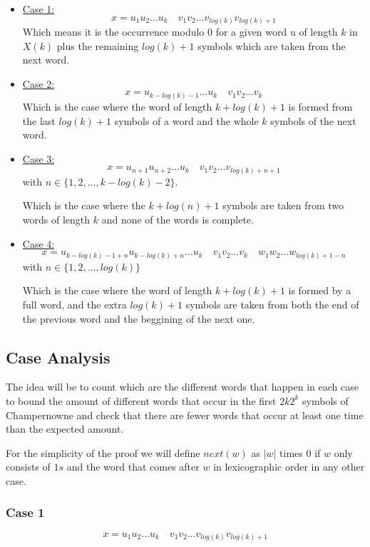 \documentclass[10pt, a4paper]{article}
\theoremstyle{definition}
\begin{document}
\begin{itemize}
  \item \underline{Case 1:} 
  $$x = u_1 u_2 \dots u_k \quad v_1 v_2 \dots v_{log(k)} v_{log(k) + 1}$$
    Which means it is the occurrence modulo 0 for a given word u of length $k$ in $X(k)$ plus the remaining $log(k) + 1$ symbols which are taken from the next word.

  \item \underline{Case 2:} 
  $$ x = u_{k-log(k)-1} \dots u_k \quad v_1 v_2 \dots v_k$$
  Which is the case where the word of length $k + log(k) + 1$ is formed from the last $log(k) + 1$ symbols of a word and the whole $k$ symbols of the next word.

  \item \underline{Case 3:} 
  $$x = u_{n+1} u_{n+2} \dots u_k \quad  v_1 v_2 \dots v_{log(k)+n+1} $$
with $n \in \{1,2,\dots ,k - log(k) - 2\}$.

   Which is the case where the $k + log(n) + 1$ symbols are taken from two words of length $k$ and none of the words is complete.

  
  \item \underline{Case 4:} 
  $$ x = u_{k-log(k)-1+n} u_{k-log(k)+n} \dots u_k \quad v_1 v_2 \dots v_k \quad w_1 w_2 \dots w_{log(k)+1-n}$$
  with $n \in \{1, 2, \dots , log(k)\}$
  
  Which is the case where the word of length $k + log(k) + 1$ is formed by a full word, and the extra $log(k) + 1$ symbols are taken from both the end of the previous word and the beggining of the next one.

\end{itemize}

\subsection{Case Analysis}
The idea will be to count which are the different words that happen in each case to bound the amount of different words that occur in the first $2k2^k$ symbols of Champernowne and check that there are fewer words that occur at least one time than the expected amount.

For the simplicity of the proof we will define $next(w)$ as $|w|$ times 0 if $w$ only consists of $1s$ and the word that comes after $w$ in lexicographic order in any other case.

\subsubsection{Case 1}
$$x = u_1 u_2 \dots u_k \quad v_1 v_2 \dots v_{log(k)} v_{log(k) + 1}$$
\end{document}
